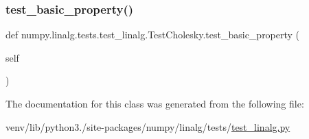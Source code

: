 \mbox{\label{classnumpy_1_1linalg_1_1tests_1_1test__linalg_1_1TestCholesky_a61bc32613e3bb58f0dc6d80d85782fb2}} 
\subsubsection{\texorpdfstring{test\+\_\+basic\+\_\+property()}{test\_basic\_property()}}
{\footnotesize\ttfamily def numpy.\+linalg.\+tests.\+test\+\_\+linalg.\+Test\+Cholesky.\+test\+\_\+basic\+\_\+property (\begin{DoxyParamCaption}\item[{}]{self }\end{DoxyParamCaption})}



The documentation for this class was generated from the following file\+:\begin{DoxyCompactItemize}
\item 
venv/lib/python3./site-\/packages/numpy/linalg/tests/\hyperlink{test__linalg_8py}{test\+\_\+linalg.\+py}\end{DoxyCompactItemize}
